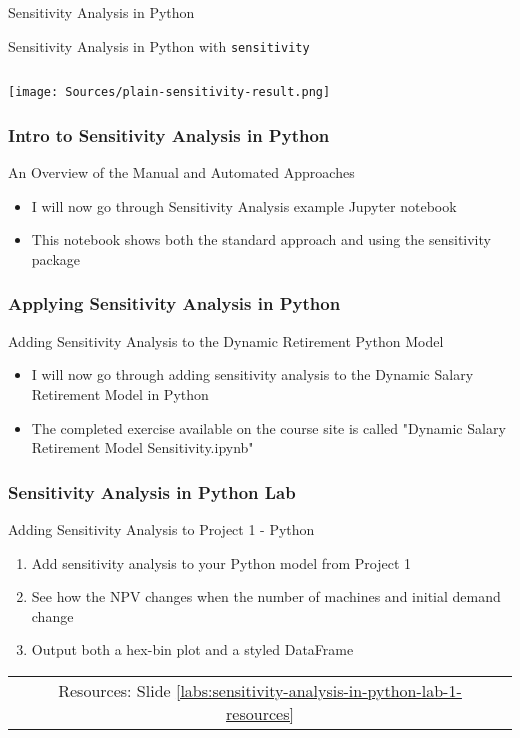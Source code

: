 \documentclass[handout, 11pt]{beamer}
\begin{document}
\begin{section}[SA Python]{Sensitivity Analysis in Python}
\begin{frame}[fragile]
\begin{block}{Sensitivity Analysis in Python with \texttt{sensitivity}}
\begin{verbatim}
\end{verbatim}
\texttt{[image: Sources/plain-sensitivity-result.png]}
\end{block}
\end{frame}
\begin{frame}
\frametitle{Intro to Sensitivity Analysis in Python}
{
\begin{block}{An Overview of the Manual and Automated Approaches}
\begin{itemize}
\item I will now go through Sensitivity Analysis example Jupyter notebook
\item This notebook shows both the standard approach and using the sensitivity package
\end{itemize}
\end{block}
}
\end{frame}
\begin{frame}
\frametitle{Applying Sensitivity Analysis in Python}
{
\begin{block}{Adding Sensitivity Analysis to the Dynamic Retirement Python Model}
\begin{itemize}
\item I will now go through adding sensitivity analysis to the Dynamic Salary Retirement Model in Python
\item The completed exercise available on the course site is called "Dynamic Salary Retirement Model Sensitivity.ipynb"
\end{itemize}
\end{block}
}
\end{frame}
\begin{frame}
\frametitle{Sensitivity Analysis in Python Lab}
{
\begin{block}{Adding Sensitivity Analysis to Project 1 - Python}
\begin{enumerate}
\item Add sensitivity analysis to your Python model from Project 1
\item See how the NPV changes when the number of machines and initial demand change
\item Output both a hex-bin plot and a styled DataFrame
\end{enumerate}
\vfill
\begin{tabular*}{\textwidth}{@{\extracolsep{\fill}}ccc}
\toprule
\hfill & Resources: Slide \textcolor{blue}{\underline{\ref{labs:sensitivity-analysis-in-python-lab-1-resources}}} & \hfill\\

\end{tabular*}
\end{block}
}
\label{labs:sensitivity-analysis-in-python-lab-1}
\end{frame}
\end{section}
\end{document}
